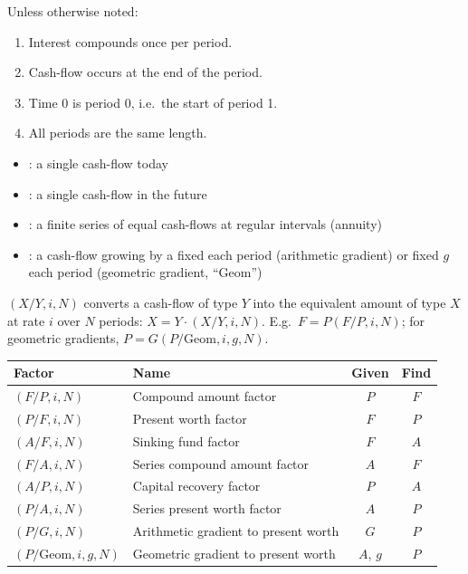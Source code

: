 
\begin{remark}
    Unless otherwise noted:
    \begin{enumerate}
        \item Interest compounds once per period.
        \item Cash-flow occurs at the end of the period.
        \item Time 0 is period 0, i.e.\ the start of period 1.
        \item All periods are the same length.
    \end{enumerate}
\end{remark}

\begin{definition}
    \begin{itemize}
        \item {}: a single cash-flow today
        \item {}: a single cash-flow in the future
        \item {}: a finite series of equal cash-flows at regular intervals (annuity)
        \item {}: a cash-flow growing by a fixed  each period (arithmetic gradient) or fixed  $g$ each period (geometric gradient, ``Geom'')
    \end{itemize}
\end{definition}

\begin{definition}
    $(X/Y,i,N)$ converts a cash-flow of type $Y$ into the equivalent
    amount of type $X$ at rate $i$ over $N$ periods: $X = Y\cdot
    (X/Y,i,N)$. E.g.\ $F = P(F/P,i,N)$; for geometric gradients,
    $P = G(P/\text{Geom},i,g,N)$.
\end{definition}

\begin{center}
    \begin{tabular}{llcc}
        \toprule
        Factor & Name & Given & Find \\
        \midrule
        $(F/P,i,N)$ & Compound amount factor & $P$ & $F$ \\
        $(P/F,i,N)$ & Present worth factor & $F$ & $P$ \\
        $(A/F,i,N)$ & Sinking fund factor & $F$ & $A$ \\
        $(F/A,i,N)$ & Series compound amount factor & $A$ & $F$ \\
        $(A/P,i,N)$ & Capital recovery factor & $P$ & $A$ \\
        $(P/A,i,N)$ & Series present worth factor & $A$ & $P$ \\
        $(P/G,i,N)$ & Arithmetic gradient to present worth & $G$ & $P$ \\
        $(P/\text{Geom},i,g,N)$ & Geometric gradient to present worth & $A$, $g$ & $P$ \\
        \bottomrule
    \end{tabular}
\end{center}

